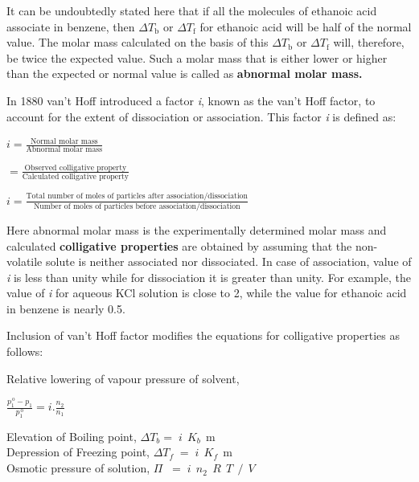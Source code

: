 \documentclass[11pt,a4paper]{article}
\begin{document}
\noindent\hfill\begin{minipage}[t]{0.735\textwidth}
\hspace*{1.5em}It can be undoubtedly stated here that if all the molecules of ethanoic acid associate in benzene, then $\Delta T_\text{b}$ or $\Delta T_\text{f}$ for ethanoic acid will be half of the normal value. The molar mass calculated on the basis of this $\Delta T_\text{b}$ or $\Delta T_\text{f}$ will, therefore, be twice the expected value. Such a molar mass that is either lower or higher than the expected or normal value is called as \textbf{abnormal molar mass.}

\hspace*{1.5em}In 1880 van't Hoff introduced a factor \textit{i}, known as the van't Hoff factor, to account for the extent of dissociation or association. This factor \textit{i} is defined as:

\noindent$\displaystyle i = \frac{\text{Normal molar mass}}{\text{Abnormal molar mass}}$

\noindent\hspace*{0.6em}$\displaystyle = \frac{\text{Observed colligative property}}{\text{Calculated colligative property}}$

\noindent$\displaystyle i = \frac{\text{Total number of moles of particles after association/dissociation}}{\text{Number of moles of particles before association/dissociation}}$

\vspace{4pt}
\hspace*{1.5em}Here abnormal molar mass is the experimentally determined molar mass and calculated \textbf{colligative properties} are obtained by assuming that the non-volatile solute is neither associated nor dissociated. In case of association, value of \textit{i} is less than unity while for dissociation it is greater than unity. For example, the value of \textit{i} for aqueous KCl solution is close to 2, while the value for ethanoic acid in benzene is nearly 0.5.

\hspace*{1.5em}Inclusion of van't Hoff factor modifies the equations for colligative properties as follows:

\hspace*{1.5em}Relative lowering of vapour pressure of solvent,

\hspace*{3em}$\displaystyle \frac{p_1^{\,\text{o}} - p_1}{p_1^{\,\text{o}}} = i.\frac{n_2}{n_1}$

\hspace*{1.5em}Elevation of Boiling point, $\Delta T_b = \;i\;\, K_b\;\, \text{m}$\\
\hspace*{1.5em}Depression of Freezing point, $\Delta T_f \;=\; i\;\, K_f\;\, \text{m}$\\
\hspace*{1.5em}Osmotic pressure of solution, $\Pi \;\;=\; i\;\, n_2\;\, R\;\, T\;\, /\;\, V$
\end{minipage}
\end{document}

